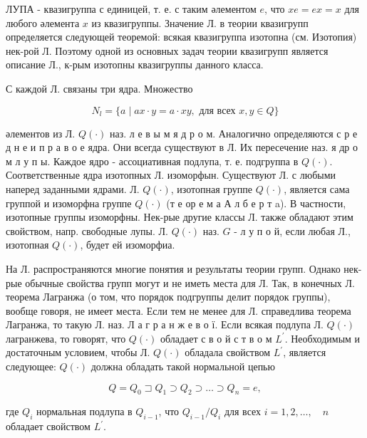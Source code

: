 \documentclass[10pt]{article}
\begin{document}
ЛУПА - квазигруппа с единицей, т. е. с таким әлементом $e$, что $x e=e x=x$ для любого әлемента $x$ из квазигруппы. Значение Л. в теории квазигрупп определяется следующей теоремой: всякая квазигруппа изотопна (см. Изотопия) нек-рой Л. Поэтому одной из основных задач теории квазигрупп является описание Л., к-рым изотопны квазигруппы данного класса.



С каждой Л. связаны три ядра. Множество



\[

N_{l}=\{a \mid a x \cdot y=a \cdot x y, \text { для всех } x, y \in Q\}

\]



әлементов из Л. $Q(\cdot)$ наз. л е в ы м я д р о м. Аналогично определяются с р е д н е и п р а в о е ядра. Они всегда существуют в Л. Их пересечение наз. я др о м л у п ы. Каждое ядро - ассоциативная подлупа, т. е. подгруппа в $Q(\cdot)$. Соответственные ядра изотопных Л. изоморфын. Существуют Л. с любыми наперед заданными ядрами. Л. $Q(\cdot)$, изотопная группе $Q(\cdot)$, является сама группой и изоморфна группе $Q(\cdot)$ (т е ор е м а А л б е р т a). В частности, изотопные группы изоморфны. Нек-рые другие классы Л. также обладают этим свойством, напр. свободные лупы. Л. $Q(\cdot)$ наз. $G$ - л у п о й, если любая Л., изотопная $Q(\cdot)$, будет ей изоморфиа.



На Л. распространяются многие понятия и результаты теории групп. Однако нек-рые обычные свойства групп могут и не иметь места для Л. Так, в конечных Л. теорема Лагранжа (о том, что порядок подгруппы делит порядок группы), вообще говоря, не имеет места. Если тем не менее для Л. справедлива теорема Лагранжа, то такую Л. наз. Л а г р а н ж е в о ї. Если всякая подлупа Л. $Q(\cdot)$ лагранжева, то говорят, что $Q(\cdot)$ обладает с в о й с т в о м $L^{\prime}$. Необходимым и достаточным условием, чтобы Л. $Q(\cdot)$ обладала свойством $L^{\prime}$, является следующее: $Q(\cdot)$ должна обладать такой нормальной цепью



\[

Q=Q_{0} \sqsupset Q_{1} \supset Q_{2} \supset \ldots \supset Q_{n}=e,

\]



где $Q_{i}$ нормальная подлупа в $Q_{i-1}$, что $Q_{i-1} / Q_{i}$ для всех $i=1,2, \ldots, \quad n$ обладает свойством $L^{\prime}$.
\end{document}
